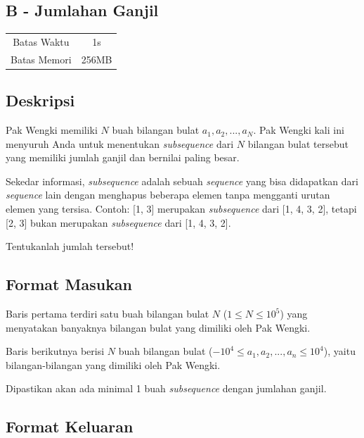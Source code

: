 \documentclass{article}
\begin{document}
\begin{center}
    \section*{B - Jumlahan Ganjil}

    \begin{tabular}{ | c c | }
        \hline
        Batas Waktu  & 1s \\    %
        Batas Memori & 256MB \\  %
        \hline
    \end{tabular}
\end{center}

\subsection*{Deskripsi}

Pak Wengki memiliki $N$ buah bilangan bulat $a_1, a_2, ..., a_N$. Pak Wengki kali ini menyuruh Anda untuk menentukan \textit{subsequence} dari $N$ bilangan bulat tersebut yang memiliki jumlah ganjil dan bernilai paling besar. 

Sekedar informasi, \textit{subsequence} adalah sebuah \textit{sequence} yang bisa didapatkan dari \textit{sequence} lain dengan menghapus beberapa elemen tanpa mengganti urutan elemen yang tersisa.
Contoh: [1, 3] merupakan \textit{subsequence} dari [1, 4, 3, 2], tetapi [2, 3] bukan merupakan \textit{subsequence} dari [1, 4, 3, 2].

Tentukanlah jumlah tersebut!

\subsection*{Format Masukan}

Baris pertama terdiri satu buah bilangan bulat $N$ ($1 \leq N \leq 10^5$) yang menyatakan banyaknya bilangan bulat yang dimiliki oleh Pak Wengki.

Baris berikutnya berisi $N$ buah bilangan bulat ($-10^4 \leq a_1, a_2, ..., a_n \leq 10^4$), yaitu bilangan-bilangan yang dimiliki oleh Pak Wengki.

Dipastikan akan ada minimal 1 buah \textit{subsequence} dengan jumlahan ganjil.

\subsection*{Format Keluaran}
\end{document}
